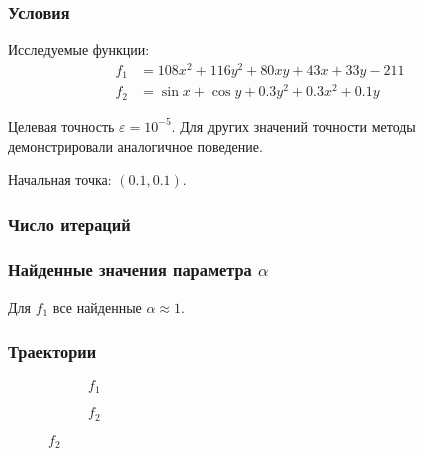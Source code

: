 \subsubsection{Условия}

Исследуемые функции:
\begin{align*}
	f_1 & = 108x^2 + 116y^2 + 80xy + 43x + 33y - 211 \\
	f_2 & = \sin x + \cos y + 0.3y^2+ 0.3x^2 + 0.1y
\end{align*}

Целевая точность \(\varepsilon = 10^{-5}\). Для других значений точности методы демонстрировали аналогичное поведение.

Начальная точка: $(0.1, 0.1)$.

\subsubsection{Число итераций}

\begin{minipage}{0.33\textwidth}
\end{minipage}
\begin{minipage}{0.33\textwidth}
\end{minipage}
\begin{minipage}{0.33\textwidth}
\end{minipage}

\subsubsection{Найденные значения параметра \(\alpha\)}

\dstable

Для $f_1$ все найденные $\alpha \approx 1$.

\subsubsection{Траектории}

\begin{figure}[h]
	\centering
	\begin{subfigure}{.5\textwidth}
		\centering
		
		\caption*{\(f_1\)}
	\end{subfigure}%
	\begin{subfigure}{.5\textwidth}
		\centering
		
		\caption*{\(f_2\)}
	\end{subfigure}
\end{figure}

